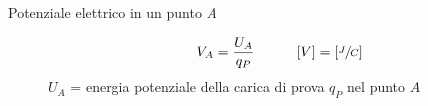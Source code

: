 \documentclass[a4paper,11pt,italian]{article}
\begin{document}
\begin{description}
  
  
%   
  
  \item[Potenziale elettrico in un punto \textit{A}]
  \[ V_A = \frac{U_A}{q_P} \hspace*{3em} [V] =  \left[ \sfrac{J}{C} \right] \]
  $ U_A $ = energia potenziale della carica di prova $ q_P $ nel punto $ A $
  

\end{description}
\end{document}
